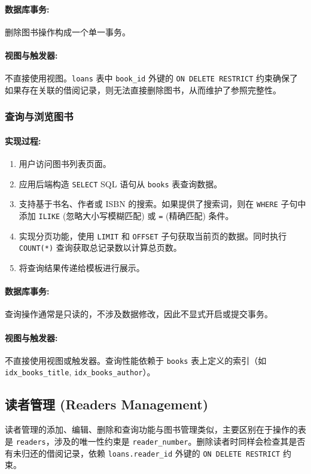 \documentclass[11pt, a4paper]{article}
\begin{document}
\paragraph{数据库事务:}
删除图书操作构成一个单一事务。
\paragraph{视图与触发器:}
不直接使用视图。\texttt{loans} 表中 \texttt{book\_id} 外键的 \texttt{ON DELETE RESTRICT} 约束确保了如果存在关联的借阅记录，则无法直接删除图书，从而维护了参照完整性。

\subsubsection{查询与浏览图书}
\paragraph{实现过程:}
\begin{enumerate}
    \item 用户访问图书列表页面。
    \item 应用后端构造 \texttt{SELECT} SQL 语句从 \texttt{books} 表查询数据。
    \item 支持基于书名、作者或 ISBN 的搜索。如果提供了搜索词，则在 \texttt{WHERE} 子句中添加 \texttt{ILIKE} (忽略大小写模糊匹配) 或 \texttt{=} (精确匹配) 条件。
    \item 实现分页功能，使用 \texttt{LIMIT} 和 \texttt{OFFSET} 子句获取当前页的数据。同时执行 \texttt{COUNT(*)} 查询获取总记录数以计算总页数。
    \item 将查询结果传递给模板进行展示。
\end{enumerate}
\paragraph{数据库事务:}
查询操作通常是只读的，不涉及数据修改，因此不显式开启或提交事务。
\paragraph{视图与触发器:}
不直接使用视图或触发器。查询性能依赖于 \texttt{books} 表上定义的索引（如 \texttt{idx\_books\_title}, \texttt{idx\_books\_author}）。

\subsection{读者管理 (Readers Management)}
读者管理的添加、编辑、删除和查询功能与图书管理类似，主要区别在于操作的表是 \texttt{readers}，涉及的唯一性约束是 \texttt{reader\_number}。删除读者时同样会检查其是否有未归还的借阅记录，依赖 \texttt{loans.reader\_id} 外键的 \texttt{ON DELETE RESTRICT} 约束。
\end{document}
